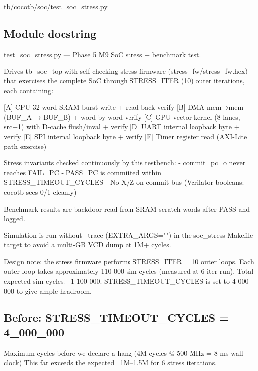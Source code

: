 \begin{relocated}{tb/cocotb/soc/test_soc_stress.py}

\subsection*{Module docstring}

\begin{textblock}
test_soc_stress.py — Phase 5 M9 SoC stress + benchmark test.

Drives tb_soc_top with self-checking stress firmware (stress_fw/stress_fw.hex) that
exercises the complete SoC through STRESS_ITER (10) outer iterations, each containing:

[A] CPU 32-word SRAM burst write + read-back verify
[B] DMA mem→mem (BUF_A → BUF_B) + word-by-word verify
[C] GPU vector kernel (8 lanes, src+1) with D-cache flush/inval + verify
[D] UART internal loopback byte + verify
[E] SPI internal loopback byte + verify
[F] Timer register read (AXI-Lite path exercise)

Stress invariants checked continuously by this testbench:
- commit_pc_o never reaches FAIL_PC
- PASS_PC is committed within STRESS_TIMEOUT_CYCLES
- No X/Z on commit bus (Verilator booleans: cocotb sees 0/1 cleanly)

Benchmark results are backdoor-read from SRAM scratch words after PASS and logged.

Simulation is run without --trace (EXTRA_ARGS="") in the soc_stress Makefile target
to avoid a multi-GB VCD dump at 1M+ cycles.

Design note: the stress firmware performs STRESS_ITER = 10 outer loops.  Each outer
loop takes approximately 110 000 sim cycles (measured at 6-iter run).
Total expected sim cycles: ~1 100 000.  STRESS_TIMEOUT_CYCLES is set to 4 000 000
to give ample headroom.
\end{textblock}

\subsection*{Before: STRESS\_TIMEOUT\_CYCLES = 4\_000\_000}

\begin{textblock}
Maximum cycles before we declare a hang (4M cycles @ 500 MHz = 8 ms wall-clock)
This far exceeds the expected ~1M–1.5M for 6 stress iterations.
\end{textblock}

\end{relocated}

